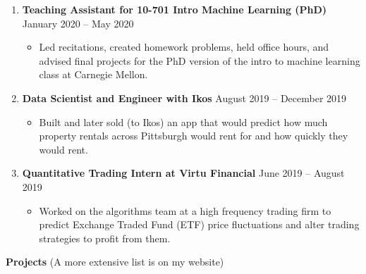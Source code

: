 \documentclass[letterpaper,11pt]{article}
\newlength{\outerbordwidth}
\newcommand{\resitem}[1]{\item #1 \vspace{-2pt}}
\newcommand{\resheading}[1]{\vspace{0pt} %
  \parbox{\textwidth}{\setlength{\FrameSep}{\outerbordwidth}
    \begin{shaded}
\setlength{\fboxsep}{0pt}\framebox[\textwidth][l]{\setlength{\fboxsep}{3.5pt}\fcolorbox{shadecolorB}{shadecolorB}{\textbf{\sffamily{\mbox{~}\makebox[7.262in][l]{\large #1} \vphantom{p\^{E}}}}}} %
    \end{shaded}
  }\vspace{-7pt} %
}
\begin{document}
\begin{enumerate}[leftmargin=10pt]
	\item[] \textbf{Teaching Assistant for \textcolor{myGreen}{10-701 Intro Machine Learning (PhD)}} \cftdotfill{\cftdotsep} January 2020 -- May 2020\\
	\vspace{-4pt}
	\begin{itemize}
		\resitem{Led recitations, created homework problems, held office hours, and advised final projects for the PhD version of the intro to machine learning class at Carnegie Mellon.}
	\end{itemize}

	\item[] \textbf{Data Scientist and Engineer with \textcolor{myGreen}{Ikos}} \cftdotfill{\cftdotsep} August 2019 -- December 2019\\
	\vspace{-4pt}	
	\begin{itemize}
		\resitem{Built and later sold (to Ikos) an app that would predict how much property rentals across Pittsburgh would rent for and how quickly they would rent.}	
	\end{itemize}
	
	\item[] \textbf{Quantitative Trading Intern at \textcolor{myGreen}{Virtu Financial}} \cftdotfill{\cftdotsep} June 2019 -- August 2019\\
	\vspace{-4pt}
	\begin{itemize}
		\resitem{Worked on the algorithms team at a high frequency trading firm to predict Exchange Traded Fund (ETF) price fluctuations and alter trading strategies to profit from them.}
	\end{itemize}
\end{enumerate}

\vspace{-10pt}

\begin{mybox}
	\hspace{-8pt} \textbf{Projects}  \fontsize{10.5}{15}\selectfont   (A more extensive list is on my website)
\end{mybox}

\end{document}
